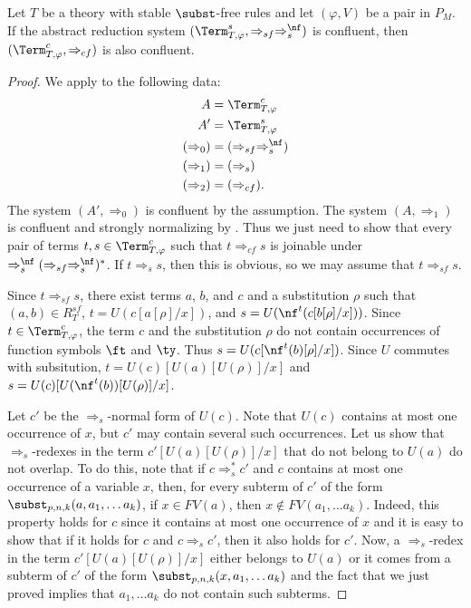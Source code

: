 \begin{prop}
Let $T$ be a theory with stable $\subst$-free rules and let $(\varphi,V)$ be a pair in $P_M$.
If the abstract reduction system $(\Term_{T,\varphi}^s, \Rightarrow_{sf} \Rightarrow_s^\nf)$ is confluent, then $(\Term_{T,\varphi}^c,\Rightarrow_{cf})$ is also confluent.
\end{prop}
\begin{proof}
We apply  to the following data:
\begin{align*}
A & = \Term_{T,\varphi}^c \\
A' & = \Term_{T,\varphi}^s \\
(\Rightarrow_0) & = (\Rightarrow_{sf} \Rightarrow_s^\nf) \\
(\Rightarrow_1) & = (\Rightarrow_s) \\
(\Rightarrow_2) & = (\Rightarrow_{cf}).
\end{align*}
The system $(A',\Rightarrow_0)$ is confluent by the assumption.
The system $(A,\Rightarrow_1)$ is confluent and strongly normalizing by .
Thus we just need to show that every pair of terms $t,s \in \Term_{T,\varphi}^c$ such that $t \Rightarrow_{cf} s$ is joinable under $\Rightarrow_s^\nf (\Rightarrow_{sf} \Rightarrow_s^\nf)^*$.
If $t \Rightarrow_s s$, then this is obvious, so we may assume that $t \Rightarrow_{sf} s$.

Since $t \Rightarrow_{sf} s$, there exist terms $a$, $b$, and $c$ and a substitution $\rho$ such that $(a,b) \in R_T^{sf}$, $t = U(c[a[\rho]/x])$, and $s = U(\nf^t(c[b[\rho]/x]))$.
Since $t \in \Term_{T,\varphi}^c$, the term $c$ and the substitution $\rho$ do not contain occurrences of function symbols $\ft$ and $\ty$.
Thus $s = U(c[\nf^t(b)[\rho]/x])$.
Since $U$ commutes with subsitution, $t = U(c)[U(a)[U(\rho)]/x]$ and $s = U(c)[U(\nf^t(b))[U(\rho)]/x]$.

Let $c'$ be the $\Rightarrow_s$-normal form of $U(c)$.
Note that $U(c)$ contains at most one occurrence of $x$, but $c'$ may contain several such occurrences.
Let us show that $\Rightarrow_s$-redexes in the term $c'[U(a)[U(\rho)]/x]$ that do not belong to $U(a)$ do not overlap.
To do this, note that if $c \Rightarrow_s^* c'$ and $c$ contains at most one occurrence of a variable $x$, then, for every subterm of $c'$ of the form $\subst_{p,n,k}(a, a_1, \ldots a_k)$, if $x \in FV(a)$, then $x \notin FV(a_1, \ldots a_k)$.
Indeed, this property holds for $c$ since it contains at most one occurrence of $x$ and it is easy to show that if it holds for $c$ and $c \Rightarrow_s c'$, then it also holds for $c'$.
Now, a $\Rightarrow_s$-redex in the term $c'[U(a)[U(\rho)]/x]$ either belongs to $U(a)$ or it comes from a subterm of $c'$ of the form $\subst_{p,n,k}(x, a_1, \ldots a_k)$ and the fact that we just proved implies that $a_1, \ldots a_k$ do not contain such subterms.


\end{proof}
